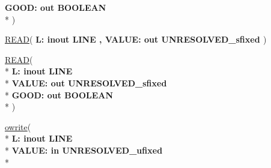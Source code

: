 \begin{DoxyCompactItemize}
  {\bfseries \textcolor{vhdlchar}{ }\textcolor{vhdlchar}{G\+O\+O\+D\+: }\textcolor{stringliteral}{} {\bfseries \textcolor{keywordflow}{out}\textcolor{vhdlchar}{ }\textcolor{comment}{B\+O\+O\+L\+E\+A\+N}\textcolor{vhdlchar}{ }}}\\*
   )
\item 
{\bfseries {\bfseries \textcolor{vhdlchar}{ }}} \hyperlink{class__fixed__pkg_a1b1262258b9fb1a68fec2aad83940efe}{R\+E\+A\+D}( {\bfseries \textcolor{vhdlchar}{ }\textcolor{vhdlchar}{L\+: }\textcolor{stringliteral}{} {\bfseries \textcolor{keywordflow}{inout}\textcolor{vhdlchar}{ }\textcolor{vhdlchar}{L\+I\+N\+E}\textcolor{vhdlchar}{ }}}{\bfseries ,\textcolor{vhdlchar}{ }\textcolor{vhdlchar}{V\+A\+L\+U\+E\+: }\textcolor{stringliteral}{} {\bfseries \textcolor{keywordflow}{out}\textcolor{vhdlchar}{ }\textcolor{vhdlchar}{U\+N\+R\+E\+S\+O\+L\+V\+E\+D\+\_\+sfixed}\textcolor{vhdlchar}{ }}} )
\item 
{\bfseries {\bfseries \textcolor{vhdlchar}{ }}} \hyperlink{class__fixed__pkg_ae7e16de39ab0d01050084742fd86814f}{R\+E\+A\+D}( \\*
{\bfseries \textcolor{vhdlchar}{ }\textcolor{vhdlchar}{L\+: }\textcolor{stringliteral}{} {\bfseries \textcolor{keywordflow}{inout}\textcolor{vhdlchar}{ }\textcolor{vhdlchar}{L\+I\+N\+E}\textcolor{vhdlchar}{ }}}\\*
  {\bfseries \textcolor{vhdlchar}{ }\textcolor{vhdlchar}{V\+A\+L\+U\+E\+: }\textcolor{stringliteral}{} {\bfseries \textcolor{keywordflow}{out}\textcolor{vhdlchar}{ }\textcolor{vhdlchar}{U\+N\+R\+E\+S\+O\+L\+V\+E\+D\+\_\+sfixed}\textcolor{vhdlchar}{ }}}\\*
  {\bfseries \textcolor{vhdlchar}{ }\textcolor{vhdlchar}{G\+O\+O\+D\+: }\textcolor{stringliteral}{} {\bfseries \textcolor{keywordflow}{out}\textcolor{vhdlchar}{ }\textcolor{comment}{B\+O\+O\+L\+E\+A\+N}\textcolor{vhdlchar}{ }}}\\*
   )
\item 
{\bfseries {\bfseries \textcolor{vhdlchar}{ }}} \hyperlink{class__fixed__pkg_a5d58f9f26562a215affad21f3ae0d368}{owrite}( \\*
{\bfseries \textcolor{vhdlchar}{ }\textcolor{vhdlchar}{L\+: }\textcolor{stringliteral}{} {\bfseries \textcolor{keywordflow}{inout}\textcolor{vhdlchar}{ }\textcolor{vhdlchar}{L\+I\+N\+E}\textcolor{vhdlchar}{ }}}\\*
  {\bfseries \textcolor{vhdlchar}{ }\textcolor{vhdlchar}{V\+A\+L\+U\+E\+: }\textcolor{stringliteral}{} {\bfseries \textcolor{keywordflow}{in}\textcolor{vhdlchar}{ }\textcolor{vhdlchar}{U\+N\+R\+E\+S\+O\+L\+V\+E\+D\+\_\+ufixed}\textcolor{vhdlchar}{ }}}\\*

\end{DoxyCompactItemize}
